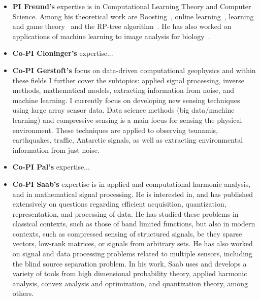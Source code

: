 \documentclass{article}
\begin{document}

\begin{itemize}
\item {\bf PI Freund's} expertise is in Computational Learning Theory and
Computer Science. Among his theoretical work are 
Boosting~\cite{}, online learning~\cite{}, learning and game
theory~\cite{} and the RP-tree algorithm~\cite{}. He has also worked
on applications of machine learning to image analysis for
biology~\cite{}. 
\item {\bf Co-PI Cloninger's} expertise... 
\item {\bf Co-PI Gerstoft's} focus on data-driven computational geophysics and within these fields I further cover the subtopics: applied signal processing, inverse methods, mathematical models, extracting information from noise, and machine learning. I currently focus on developing new sensing techniques using large array sensor data. Data science methods (big data/machine learning) and compressive sensing is a main focus for sensing the physical environment.  These techniques are applied to observing tsunamis, earthquakes, traffic, Antarctic signals, as well as extracting environmental information from just noise. 
\item {\bf Co-PI Pal's} expertise... 
\item {\bf Co-PI Saab's} expertise is in applied and computational harmonic analysis, and in mathematical signal processing. He is interested in, and has published extensively on questions regarding efficient acquisition, quantization, representation, and processing of data. He has studied these problems in classical contexts, such as those of band limited functions, but also in modern contexts, such as compressed sensing of structured signals, be they sparse vectors, low-rank matrices, or signals from arbitrary sets. He has also worked on signal and data processing problems related to multiple sensors, including the blind source separation problem. In his work, Saab uses and develops a variety of tools from high dimensional probability theory, applied harmonic analysis, convex analysis and optimization, and quantization theory, among others. 
\end{itemize}
\end{document}
